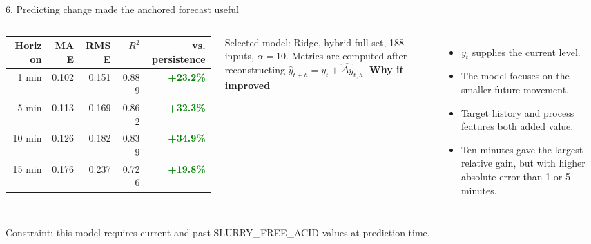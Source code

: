 \documentclass[10pt,aspectratio=169]{beamer}
\newcommand{\good}[1]{\textcolor{Green}{\textbf{#1}}}
\newcommand{\smallnote}[1]{{\scriptsize\color{Gray}#1}}
\begin{document}
\begin{frame}{6. Predicting change made the anchored forecast useful}
  \begin{columns}[T,onlytextwidth]
      \small
      \begin{tabular}{rrrrr}
        \toprule
        Horizon & MAE & RMSE & $R^2$ & vs. persistence \\
        \midrule
        1 min  & 0.102 & 0.151 & 0.889 & \good{+23.2\%} \\
        5 min  & 0.113 & 0.169 & 0.862 & \good{+32.3\%} \\
        10 min & 0.126 & 0.182 & 0.839 & \good{+34.9\%} \\
        15 min & 0.176 & 0.237 & 0.726 & \good{+19.8\%} \\
        \bottomrule
      \end{tabular}
      \vspace{0.2cm}

      \smallnote{Selected model: Ridge, hybrid full set, 188 inputs, $\alpha=10$. Metrics are computed after reconstructing $\hat y_{t+h}=y_t+\widehat{\Delta y}_{t,h}$.}
      \textbf{Why it improved}
      \begin{itemize}
        \item $y_t$ supplies the current level.
        \item The model focuses on the smaller future movement.
        \item Target history and process features both added value.
        \item Ten minutes gave the largest relative gain, but with higher absolute error than 1 or 5 minutes.
      \end{itemize}
  \end{columns}

  \vfill
  \alert{Constraint:} this model requires current and past SLURRY\_FREE\_ACID values at prediction time.
\end{frame}
\end{document}
